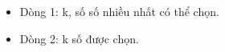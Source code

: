 \begin{itemize}
	\item     Dòng 1: k, số số nhiều nhất có thể chọn.   
	\item     Dòng 2: k số được chọn.   
\end{itemize}